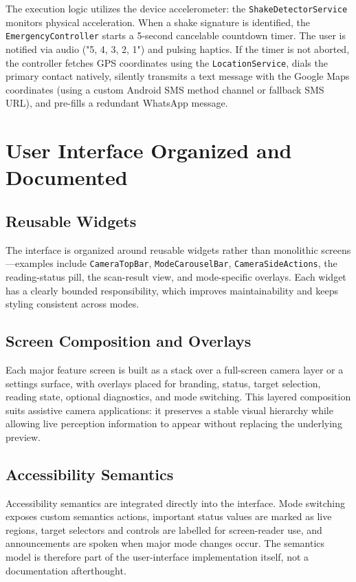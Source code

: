 \documentclass[a4paper]{report}
\begin{document}
The execution logic utilizes the device accelerometer: the \texttt{ShakeDetectorService} monitors physical acceleration. When a shake signature is identified, the \texttt{EmergencyController} starts a 5-second cancelable countdown timer. The user is notified via audio ("5, 4, 3, 2, 1") and pulsing haptics. If the timer is not aborted, the controller fetches GPS coordinates using the \texttt{LocationService}, dials the primary contact natively, silently transmits a text message with the Google Maps coordinates (using a custom Android SMS method channel or fallback SMS URL), and pre-fills a redundant WhatsApp message.

\section{User Interface Organized and Documented}
\subsection{Reusable Widgets}
The interface is organized around reusable widgets rather than monolithic screens---examples include \texttt{CameraTopBar}, \texttt{ModeCarouselBar}, \texttt{CameraSideActions}, the reading-status pill, the scan-result view, and mode-specific overlays. Each widget has a clearly bounded responsibility, which improves maintainability and keeps styling consistent across modes.

\subsection{Screen Composition and Overlays}
Each major feature screen is built as a stack over a full-screen camera layer or a settings surface, with overlays placed for branding, status, target selection, reading state, optional diagnostics, and mode switching. This layered composition suits assistive camera applications: it preserves a stable visual hierarchy while allowing live perception information to appear without replacing the underlying preview.

\subsection{Accessibility Semantics}
Accessibility semantics are integrated directly into the interface. Mode switching exposes custom semantics actions, important status values are marked as live regions, target selectors and controls are labelled for screen-reader use, and announcements are spoken when major mode changes occur. The semantics model is therefore part of the user-interface implementation itself, not a documentation afterthought.
\end{document}
